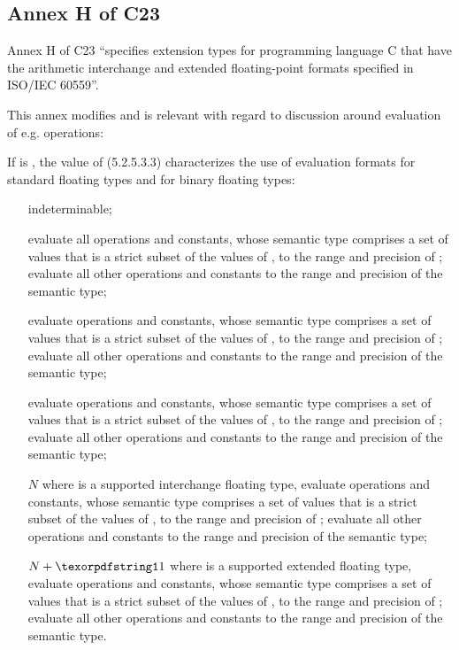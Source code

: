 \subsection{Annex H of C23}

Annex H of C23 “specifies extension types for programming language C that have
the arithmetic interchange and extended floating-point formats specified in
ISO/IEC 60559”.

This annex modifies  and is relevant with regard to
discussion around evaluation of e.g.  operations:
\begin{wgText}
  \setcounter{Paras}{1}\pnum
  If  is , the value of 
  (5.2.5.3.3) characterizes the use of evaluation formats for standard floating
  types and for binary floating types:
  \begin{itemize}
    \item[\code{-1}] indeterminable;
    \item [\code 0] evaluate all operations and constants, whose semantic type
      comprises a set of values that is a strict subset of the values of
      \float, to the range and precision of \float; evaluate all other
      operations and constants to the range and precision of the semantic type;
    \item [\code 1] evaluate operations and constants, whose semantic type comprises
      a set of values that is a strict subset of the values of \double, to the
      range and precision of \double; evaluate all other operations and
      constants to the range and precision of the semantic type;
    \item [\code 2] evaluate operations and constants, whose semantic type comprises
      a set of values that is a strict subset of the values of , to the range and precision of ; evaluate all
      other operations and constants to the range and precision of the semantic
      type;
    \item [$N$] where  is a supported interchange floating
      type, evaluate operations and constants, whose semantic type comprises a
      set of values that is a strict subset of the values of ,
      to the range and precision of ; evaluate all other
      operations and constants to the range and precision of the semantic type;
    \item [$N + \code{1}$] where  is a supported extended
      floating type, evaluate operations and constants, whose semantic type
      comprises a set of values that is a strict subset of the values of
      , to the range and precision of ;
      evaluate all other operations and constants to the range and precision of
      the semantic type.
  \end{itemize}
\end{wgText}

